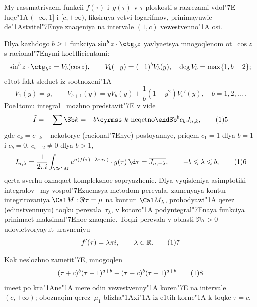 My rassmatrivaem funkcii $f(\tau)$ i~$g(\tau)$
v $\tau$-ploskosti s razrezami vdol\char"7E{} luqe\char"1A{} $(-\infty,1]$
i $[c,+\infty)$, fiksiruya vetvi logarifmov,
prinimayuwie de\char"1Astvi\-tel\char"7Enye znaqeniya na intervale
$(1,c)$ vewestvenno\char"1A{} osi.

Dlya kazhdogo $b\ge1$ funkciya $\sin^bz\cdot\ctg_bz$
yavlyaet\hbox{s}ya mnogoqlenom ot~$\cos z$
s racional\char"7Enymi koe1fficientami:
$$
\sin^bz\cdot\ctg_bz=V_b(\cos z),
\qquad V_b(-y)=(-1)^bV_b(y), \quad \deg V_b=\max\{1,b-2\};
$$
e1tot fakt sleduet iz sootnoxeni\char"1A{}
$$
V_1(y)=y, \qquad
V_{b+1}(y)=yV_b(y)+\frac1b(1-y^2)V_b'(y), \quad b=1,2,\dots\,.
$$
Poe1tomu integral~ mozhno predstavit\char"7E{} v vide
$$
\tilde I=-\sum\Sb k=-b\\\text{\cyrmss $k$ neqetno}\endSb^bc_kJ_{n,k},
\tag15
$$
gde $c_k=c_{-k}$ -- nekotorye (racional\char"7Enye) postoyannye,
priqem $c_1=1$ dlya $b=1$ i $c_b=0$, $c_{b-2}\ne0$ dlya $b>1$,
$$
J_{n,\lambda}
=\frac1{2\pi i}\int_{\Cal M}e^{n(f(\tau)-\lambda\pi i\tau)}
\cdot g(\tau)\,\d\tau
=\ol{J_{n,-\lambda}},
\qquad -b\le\lambda\le b,
\tag16
$$
qerta sverhu oznaqaet kompleksnoe sopryazhenie. Dlya vyqisleniya
asimptotiki integralov~ my vospol\char"7Ezuemsya metodom
perevala, zamenyaya kontur integrirovaniya $\Cal M:\Re\tau=\mu$
na kontur~$\Cal M_\lambda$, prohodyawi\char"1A{} qerez (edinstvennuyu) toqku
perevala~$\tau_\lambda$, v kotoro\char"1A{} podyntegral\char"7Enaya funkciya
prinimaet maksimal\char"7Enoe znaqenie. Toqki perevala
v oblasti $\Re\tau>0$ udovletvoryayut uravneniyu
$$
f'(\tau)=\lambda\pi i, \qquad \lambda\in\Bbb R.
\tag17
$$

Kak neslozhno zametit\char"7E, mnogoqlen
$$
(\tau+c)^b(\tau-1)^{a+b}-(\tau-c)^b(\tau+1)^{a+b}
\tag18
$$
imeet po kra\char"1Ane\char"1A{} mere odin vewestvenny\char"1A{} koren\char"7E{}
na intervale $(c,+\infty)$; oboznaqim qerez~$\mu_1$
blizha\char"1Axi\char"1A{} iz e1tih korne\char"1A{} k toqke $\tau=c$.

